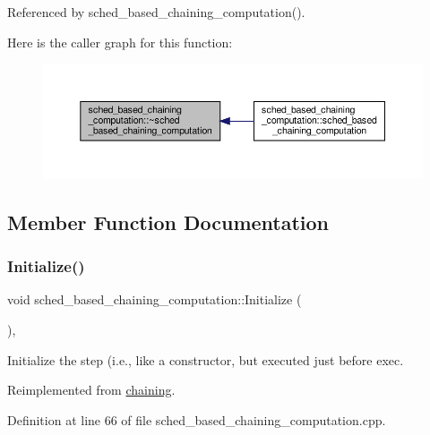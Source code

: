 Referenced by sched\+\_\+based\+\_\+chaining\+\_\+computation().

Here is the caller graph for this function\+:
\nopagebreak
\begin{figure}[H]
\begin{center}
\leavevmode
\includegraphics[width=350pt]{d7/d8d/classsched__based__chaining__computation_af282ab6da358a273c46617a1070faa5e_icgraph}
\end{center}
\end{figure}


\subsection{Member Function Documentation}
\mbox{\label{classsched__based__chaining__computation_a86daa9b72e0e2d9a939e80aa22055d4e}} 
\subsubsection{\texorpdfstring{Initialize()}{Initialize()}}
{\footnotesize\ttfamily void sched\+\_\+based\+\_\+chaining\+\_\+computation\+::\+Initialize (\begin{DoxyParamCaption}{ }\end{DoxyParamCaption})\hspace{0.3cm}{\ttfamily [override]}, {\ttfamily [virtual]}}



Initialize the step (i.\+e., like a constructor, but executed just before exec. 



Reimplemented from \hyperlink{classchaining_a2ec8eacb120c33974ba7829842910880}{chaining}.



Definition at line 66 of file sched\+\_\+based\+\_\+chaining\+\_\+computation.\+cpp.



